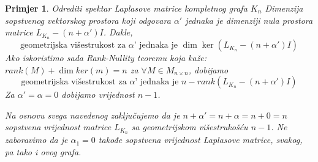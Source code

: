 \documentclass[11pt]{article}
\newtheorem{example}{Primjer}
\begin{document}
\begin{example}{Odrediti spektar Laplasove matrice kompletnog grafa $K_n$}
	Dimenzija sopstvenog vektorskog prostora koji odgovara $\alpha'$ jednaka je dimenziji nula prostora matrice $L_{K_n} - (n + \alpha') I$.
	Dakle,
	\[
	\text{geometrijska višestrukost za } \alpha \text{' jednaka je } \dim \ker(L_{K_n} - (n + \alpha') I)
	\] 
	Ako iskoristimo sada Rank-Nullity teoremu koja kaže:
	$rank(M) + \dim ker(m) = n$ za $\forall M \in M_{n \times n}$, dobijamo 
	\[
	\text{geometrijska višestrukost za } \alpha \text{' jednaka je } n - rank(L_{K_n} - (n + \alpha') I)
	\] 
	Za $\alpha' = \alpha = 0$ dobijamo vrijednost $n-1$.
	
	Na osnovu svega navedenog zaključujemo da je $n + \alpha' = n + \alpha = n + 0 = n$ sopstvena vrijednost matrice $L_{K_n}$ sa geometrijskom višestrukošću $n-1$. Ne zaboravimo da je $\alpha_1=0$ takođe sopstvena vrijednost Laplasove matrice, svakog, pa tako i ovog grafa.
	

\end{example}
\end{document}
